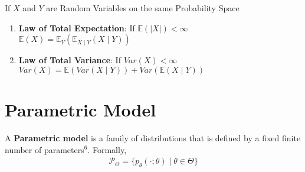 \documentclass[a4paper,portrait,columns=2, hidelinks]{cheatsheet}
\begin{document}
If \(X\) and \(Y\) are Random Variables on the same Probability Space
\begin{enumerate}
	\item \textbf{Law of Total Expectation}: If \(\mathbb{E}(|X|)<\infty\) \(\mathbb{E}(X)=\mathbb{E}_{Y}(\mathbb{E}_{X \mid Y}(X \mid Y))\)
	\item \textbf{Law of Total Variance}: If \(Var(X)<\infty\)
	\(Var(X)=\mathbb{E}(Var(X \mid Y))+Var(\mathbb{E}(X \mid Y))\)
\end{enumerate}

\section{Parametric Model}
A \textbf{Parametric model} is a family of distributions that is defined by a fixed finite number of parameters\hyperref[sec:ft6]{$^6$}. Formally,
\begin{align*}
 \mathcal{P}_\Theta = \{ p_\theta (\cdot ; \theta) \mid \theta \in \Theta \}
\end{align*}
\end{document}
